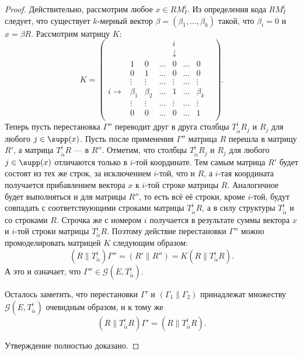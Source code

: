 \begin{proof}
Действительно, рассмотрим любое $x\in RM^i_I$. Из определения кода
$RM^i_I$ следует, что существует $k$-мерный вектор
$\beta=(\beta_1,\ldots,\beta_k)$ такой, что $\beta_i=0$ и $x=\beta
R$. Рассмотрим матрицу $K$:
$$
K=\begin{pmatrix}
 &&         &          &       i           &                &\\
          &&         &          &       \downarrow           &&                \\
    &1     &        0&    \ldots&       0&     \ldots&               0&\\
    &0     &        1&    \ldots&       0&     \ldots&               0&\\
    &\vdots&   \vdots&    \ldots&  \vdots&     \ldots&          \vdots&\\
  i\rightarrow&\beta_1& \beta_2&    \ldots&       1&     \ldots&    \beta_k&\\
    &\vdots&   \vdots&    \ldots&  \vdots&     \ldots&          \vdots&\\
     &    0&        0&    \ldots&       0&     \ldots&               1&\\
     &&&&&&
\end{pmatrix}.
$$
Теперь пусть перестановка $\Gamma''$ переводит друг в друга
столбцы $T^i_{\widetilde\alpha}R_j$ и $R_j$ для любого $j\in
\supp(x)$. Пусть после применения $\Gamma''$ матрица $R$ перешла в
матрицу $R'$, а матрица $T^i_{\widetilde\alpha}R$ --- в $R''$.
Отметим, что столбцы $T^i_{\widetilde\alpha}R_j$ и $R_j$ для
любого $j\in \supp(x)$ отличаются только в $i$-той координате. Тем
самым матрица $R'$ будет состоят из тех же строк, за исключением
$i$-той, что и $R$, а $i$-тая координата получается прибавлением
вектора $x$ к $i$-той строке матрицы $R$. Аналогичное будет
выполняться и для матрицы $R''$, то есть всё её строки, кроме
$i$-той, будут совпадать с соответствующими строками матрицы
$T^i_{\widetilde\alpha}R$, а в силу структуры
$T^i_{\widetilde\alpha}$ и со строками $R$. Строчка же с номером
$i$ получается в результате суммы вектора $x$ и $i$-той строки
матрицы $T^i_{\widetilde\alpha}R$. Поэтому действие перестановки
$\Gamma''$ можно промоделировать матрицей $K$ следующим образом:
$$
(R\|T^i_{\widetilde\alpha})\Gamma''=(R'\|R'')=K(R\|T^i_{\widetilde\alpha}R).
$$
А это и означает, что $\Gamma''\in\mathcal
G(E,T^i_{\widetilde\alpha})$.

Осталось заметить, что перестановки $\Gamma'$ и
$(\Gamma_1\|\Gamma_2)$ принадлежат множеству $\mathcal
G(E,T^i_{\widetilde\alpha})$ очевидным образом, и к тому же
$$
(R\|T^i_{\widetilde\alpha}R)\Gamma'=(R\|T^i_{\widetilde\alpha}R).
$$

Утверждение полностью доказано.
\end{proof}

